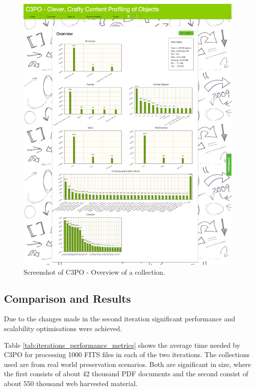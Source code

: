 \begin{figure}[tbp]
\begin{center}
\includegraphics[width=5.5in]{figures/architecture/web_app_overview}
\caption{Screenshot of C3PO - Overview of a collection.}
\label{fig:web_app_overview}
\end{center}
\end{figure}
\clearpage

\subsection{Comparison and Results}
Due to the changes made in the second iteration significant performance and scalability optimisations were achieved.

Table \ref{tab:iterations_performance_metrics} shows the average time needed by C3PO for processing 1000 FITS files in each of the two iterations. The collections used are from real world preservation scenarios. Both are significant in size, where the first consists of about 42 thousand PDF documents and the second consist of about 550 thousand web harvested material. 

